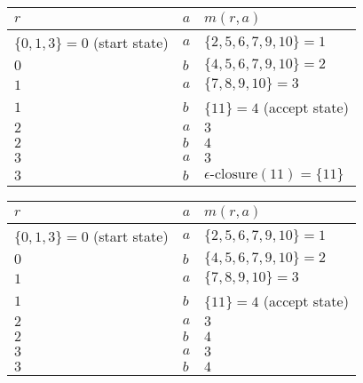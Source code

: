 \documentclass[8pt,a4paper,compress]{beamer}
\begin{document}
\begin{frame}[fragile]
\begin{overprint}
\begin{center}
\begin{tabular}{|C{4cm}|C{.5cm}|C{4cm}|} \hline
$r$ & $a$ & $m(r, a)$ \\ \hline \hline
$\{0, 1, 3\} = 0$ (start state) & $a$ &  $\{2, 5, 6, 7, 9, 10\} = 1$ \\ \hline
$0$ & $b$ & $\{4, 5, 6, 7, 9, 10\} = 2$  \\ \hline
$1$ & $a$ & $\{7, 8, 9, 10\} = 3$  \\ \hline
$1$ & $b$ & $\{11\} = 4$ (accept state) \\ \hline
$2$ & $a$ & $3$ \\ \hline
$2$ & $b$ & $4$ \\ \hline
$3$ & $a$ & $3$ \\ \hline
$3$ & $b$ & $\epsilon\text{-closure}(11) = \{11\}$ \\ \hline
\end{tabular}
\end{center}

\begin{center}
\begin{tabular}{|C{4cm}|C{.5cm}|C{4cm}|} \hline
$r$ & $a$ & $m(r, a)$ \\ \hline \hline
$\{0, 1, 3\} = 0$ (start state) & $a$ &  $\{2, 5, 6, 7, 9, 10\} = 1$ \\ \hline
$0$ & $b$ & $\{4, 5, 6, 7, 9, 10\} = 2$  \\ \hline
$1$ & $a$ & $\{7, 8, 9, 10\} = 3$  \\ \hline
$1$ & $b$ & $\{11\} = 4$ (accept state) \\ \hline
$2$ & $a$ & $3$ \\ \hline
$2$ & $b$ & $4$ \\ \hline
$3$ & $a$ & $3$ \\ \hline
$3$ & $b$ & $4$ \\ \hline
\end{tabular}
\end{center}
\end{overprint}
\end{frame}
\end{document}
